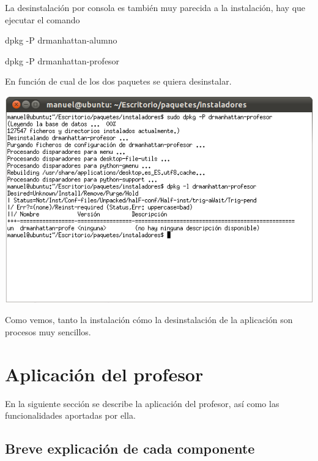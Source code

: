 \documentclass[11pt]{article}
\begin{document}
La desinstalación por consola es también muy parecida a la instalación, hay que ejecutar el comando

\begin{center}
    dpkg -P drmanhattan-alumno

    dpkg -P drmanhattan-profesor
\end{center}

En función de cual de los dos paquetes se quiera desinstalar.

\begin{center}

    \includegraphics[width=.90\linewidth]{imagenes/desConsola}

\end{center}

Como vemos, tanto la instalación cómo la desinstalación de la aplicación son procesos muy sencillos.


\newpage
\section{Aplicación del profesor}

En la siguiente sección se describe la aplicación del profesor, así como las funcionalidades aportadas por ella.

\subsection{Breve explicación de cada componente}
\end{document}

